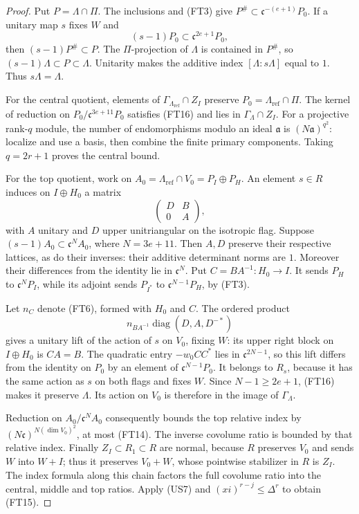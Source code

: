 \begin{proof}
Put $P=\Lambda\cap\Pi$.  The inclusions and (FT3) give
$P^\#\subset\mathfrak c^{-(e+1)}P_0$.
If a unitary map $s$ fixes $W$ and
\[
                      (s-1)P_0\subset\mathfrak c^{2e+1}P_0,
 \tag{FT16}
\]
then $(s-1)P^\#\subset P$.
The $\Pi$-projection of $\Lambda$ is contained in $P^\#$,
so $(s-1)\Lambda\subset P\subset\Lambda$.
Unitarity makes the additive index $[\Lambda:s\Lambda]$
equal to $1$.  Thus $s\Lambda=\Lambda$.

For the central quotient, elements of
$\Gamma_{\Lambda_{\mathrm{ref}}}\cap Z_I$ preserve
$P_0=\Lambda_{\mathrm{ref}}\cap\Pi$.
The kernel of reduction on
$P_0/\mathfrak c^{3e+11}P_0$ satisfies (FT16) and
lies in $\Gamma_\Lambda\cap Z_I$.
For a projective rank-$q$ module, the number of
endomorphisms modulo an ideal $\mathfrak a$ is
$(N\mathfrak a)^{q^2}$: localize and use a basis,
then combine the finite primary components.
Taking $q=2r+1$ proves the central bound.

For the top quotient, work on
$A_0=\Lambda_{\mathrm{ref}}\cap V_0=P_I\oplus P_H$.
An element $s\in R$ induces on $I\oplus H_0$ a
matrix
\[
             \begin{pmatrix}D&B\\0&A\end{pmatrix},
\]
with $A$ unitary and $D$ upper unitriangular on the
isotropic flag.  Suppose $(s-1)A_0\subset\mathfrak c^NA_0$,
where $N=3e+11$.  Then $A,D$ preserve their respective
lattices, as do their inverses: their additive determinant
norms are $1$.  Moreover their differences from the
identity lie in $\mathfrak c^N$.
Put $C=BA^{-1}:H_0\to I$.  It sends $P_H$ to
$\mathfrak c^NP_I$, while its adjoint sends $P_{I^*}$
to $\mathfrak c^{N-1}P_H$, by (FT3).

Let $n_C$ denote (FT6), formed with $H_0$ and $C$.
The ordered product
\[
                    n_{BA^{-1}}
                       \operatorname{diag}(D,A,D^{-*})
\]
gives a unitary lift of the action of $s$ on $V_0$,
fixing $W$: its upper right block on $I\oplus H_0$
is $CA=B$.
The quadratic entry $-w_0CC^*$ lies in
$\mathfrak c^{2N-1}$, so this lift differs from the
identity on $P_0$ by an element of
$\mathfrak c^{N-1}P_0$.  It belongs to $R_s$, because
it has the same action as $s$ on both flags and fixes
$W$.  Since $N-1\geq2e+1$, (FT16) makes it preserve
$\Lambda$.  Its action on $V_0$ is therefore in the
image of $\Gamma_\Lambda$.

Reduction on $A_0/\mathfrak c^NA_0$ consequently bounds
the top relative index by
$(N\mathfrak c)^{N(\dim V_0)^2}$, at most (FT14).
The inverse covolume ratio is bounded by that relative
index.  Finally $Z_I\subset R_1\subset R$ are normal,
because $R$ preserves $V_0$ and sends $W$ into $W+I$;
thus it preserves $V_0+W$, whose pointwise stabilizer
in $R$ is $Z_I$.  The index formula along this chain factors the full
covolume ratio into the central, middle and top ratios.
Apply (US7) and $(xi)^{r-j}\leq\Delta^r$ to obtain
(FT15).
\end{proof}
